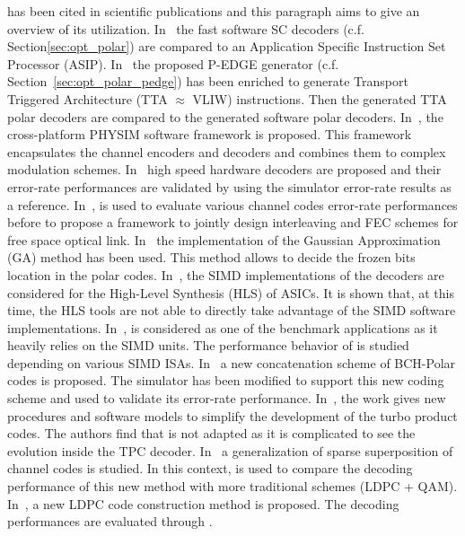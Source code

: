 
\AFFECT has been cited in scientific publications and this paragraph aims to
give an overview of its utilization. In~\cite{Leonardon2018a} the \AFFECT fast
software SC decoders (c.f. Section\ref{sec:opt_polar}) are compared to an
Application Specific Instruction Set Processor (ASIP). In~\cite{Leonardon2018b}
the proposed P-EDGE generator (c.f. Section~\ref{sec:opt_polar_pedge}) has been
enriched to generate Transport Triggered Architecture (TTA $\approx$ VLIW)
instructions. Then the generated TTA polar decoders are compared to the \AFFECT
generated software polar decoders. In~\cite{Florian2018}, the cross-platform
PHYSIM software framework is proposed. This framework encapsulates the \AFFECT
channel encoders and decoders and combines them to complex modulation schemes.
In~\cite{Pignoly2018,Ghanaatian2018,Wang2019} high speed hardware decoders are
proposed and their error-rate performances are validated by using the \AFFECT
simulator error-rate results as a reference. In~\cite{Poulenard2018}, \AFFECT is
used to evaluate various channel codes error-rate performances before to propose
a framework to jointly design interleaving and FEC schemes for free space
optical link. In~\cite{Cavatassi2019a,Cavatassi2019b} the \AFFECT implementation
of the Gaussian Approximation (GA) method has been used. This method allows to
decide the frozen bits location in the polar codes. In~\cite{Cenova2019}, the
SIMD implementations of the \AFFECT decoders are considered for the High-Level
Synthesis (HLS) of ASICs. It is shown that, at this time, the HLS tools are not
able to directly take advantage of the \Cxx SIMD software implementations.
In~\cite{Guermouche2019}, \AFFECT is considered as one of the benchmark
applications as it heavily relies on the SIMD units. The performance behavior of
\AFFECT is studied depending on various SIMD ISAs. In~\cite{Wang2019} a new
concatenation scheme of BCH-Polar codes is proposed. The \AFFECT simulator has
been modified to support this new coding scheme and used to validate its
error-rate performance. In~\cite{Krainyk2019}, the work gives new procedures and
software models to simplify the development of the turbo product codes. The
authors find that \AFFECT is not adapted as it is complicated to see the
evolution inside the TPC decoder. In~\cite{Hsieh2020,Rush2020} a generalization
of sparse superposition of channel codes is studied. In this context, \AFFECT is
used to compare the decoding performance of this new method with more
traditional schemes (LDPC + QAM). In~\cite{Tasdighi2020}, a new LDPC code
construction method is proposed. The decoding performances are evaluated through
\AFFECT.

